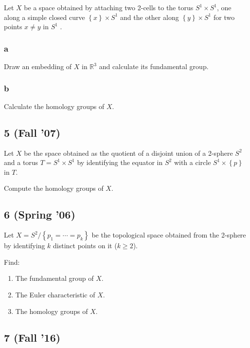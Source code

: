 Let \(X\) be a space obtained by attaching two 2-cells to the torus
\(S^1 \times S^1\), one along a simple closed curve
\(\left\{{x}\right\} \times S^1\) and the other along
\(\left\{{y}\right\} \times S^1\) for two points \(x \neq y\) in \(S^1\)
.

\hypertarget{a}{%
\subsubsection{a}\label{a}}

Draw an embedding of \(X\) in \({\mathbb{R}}^3\) and calculate its
fundamental group.

\hypertarget{b}{%
\subsubsection{b}\label{b}}

Calculate the homology groups of \(X\).

\hypertarget{fall-07-3}{%
\subsection{5 (Fall '07)}\label{fall-07-3}}

Let \(X\) be the space obtained as the quotient of a disjoint union of a
2-sphere \(S^2\) and a torus \(T = S^1 \times S^1\) by identifying the
equator in \(S^2\) with a circle \(S^1 \times \left\{{p}\right\}\) in
\(T\).

Compute the homology groups of \(X\).

\hypertarget{spring-06-4}{%
\subsection{6 (Spring '06)}\label{spring-06-4}}

Let \(X = S^2 / \left\{{p_1 = \cdots = p_k }\right\}\) be the
topological space obtained from the 2-sphere by identifying \(k\)
distinct points on it (\(k \geq 2\)).

Find:

\begin{enumerate}
\def\labelenumi{\alph{enumi}.}
\item
  The fundamental group of \(X\).
\item
  The Euler characteristic of \(X\).
\item
  The homology groups of \(X\).
\end{enumerate}

\hypertarget{fall-16-4}{%
\subsection{7 (Fall '16)}\label{fall-16-4}}

